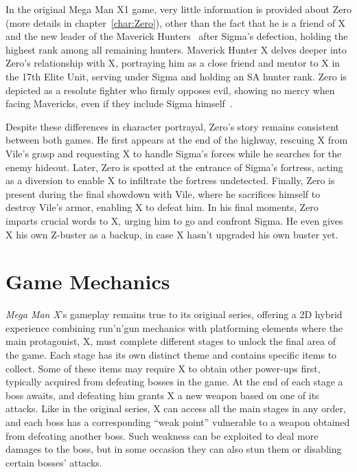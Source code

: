 In the original Mega Man X1 game, very little information is provided about Zero (more details in chapter~\ref{char:Zero}), other than the fact that he is a friend of X and the new leader of the Maverick Hunters~\cite{X:Manual} after Sigma's defection, holding the highest rank among all remaining hunters. Maverick Hunter X delves deeper into Zero's relationship with X, portraying him as a close friend and mentor to X in the 17th Elite Unit, serving under Sigma and holding an SA hunter rank. Zero is depicted as a resolute fighter who firmly opposes evil, showing no mercy when facing Mavericks, even if they include Sigma himself~\cite{Xcoll1:Manual_X1}.

Despite these differences in character portrayal, Zero's story remains consistent between both games. He first appears at the end of the highway, rescuing X from Vile's grasp and requesting X to handle Sigma's forces while he searches for the enemy hideout. Later, Zero is spotted at the entrance of Sigma's fortress, acting as a diversion to enable X to infiltrate the fortress undetected. Finally, Zero is present during the final showdown with Vile, where he sacrifices himself to destroy Vile's armor, enabling X to defeat him. In his final moments, Zero imparts crucial words to X, urging him to go and confront Sigma. He even gives X his own Z-buster as a backup, in case X hasn't upgraded his own buster yet.

\section{Game Mechanics}
\textit{Mega Man X}'s gameplay remains true to its original series, offering a 2D hybrid experience combining run'n'gun mechanics with platforming elements where the main protagonist, X, must complete different stages to unlock the final area of the game. Each stage has its own distinct theme and contains specific items to collect. Some of these items may require X to obtain other power-ups first, typically acquired from defeating bosses in the game. At the end of each stage a boss awaits, and defeating him grants X a new weapon based on one of its attacks. Like in the original series, X can access all the main stages in any order, and each boss has a corresponding ``weak point'' vulnerable to a weapon obtained from defeating another boss. Such weakness can be exploited to deal more damages to the boss, but in some occasion they can also stun them or disabling certain bosses' attacks.

